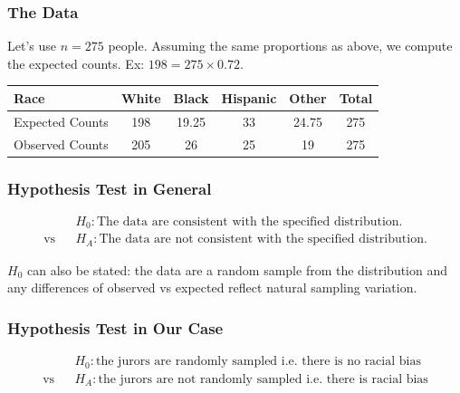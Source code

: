 \documentclass[slides]{beamer}
\newcommand{\blue}[1]{\textcolor{blue2}{#1}}
\begin{document}
\begin{frame}[fragile]
\frametitle{The Data}

Let's use $n=275$ people.  Assuming the same proportions as above,  we compute the \blue{expected} counts.  Ex: $198 = 275 \times 0.72$. 

\begin{center}
\begin{tabular}{l||cccc|c}
Race & White & Black & Hispanic & Other & Total \\ 
\hline
Expected Counts & 198 & 19.25 & 33 & 24.75 & 275\\ 
Observed Counts & 205 & 26 & 25 & 19 & 275\\ 
\end{tabular}
\end{center}

\end{frame}


\begin{frame}[fragile]
\frametitle{Hypothesis Test in General}
%
%
\begin{eqnarray*}
&&H_0:\mbox{The data are consistent with the specified distribution.}\\
\mbox{vs} &&H_A:\mbox{The data are not consistent with the specified distribution.}
\end{eqnarray*}

\pause $H_0$ can also be stated: the data are a random sample from the distribution and any differences of observed vs expected reflect natural sampling variation.  

\end{frame}


\begin{frame}[fragile]
\frametitle{Hypothesis Test in Our Case}
%
%
\begin{eqnarray*}
&& H_0:\mbox{the jurors are randomly sampled i.e. there is no racial bias}\\
\mbox{vs}&& H_A:\mbox{the jurors are not randomly sampled i.e. there is racial bias}
\end{eqnarray*}

\end{frame}
\end{document}
